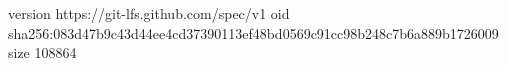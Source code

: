 version https://git-lfs.github.com/spec/v1
oid sha256:083d47b9c43d44ee4cd37390113ef48bd0569c91cc98b248c7b6a889b1726009
size 108864
